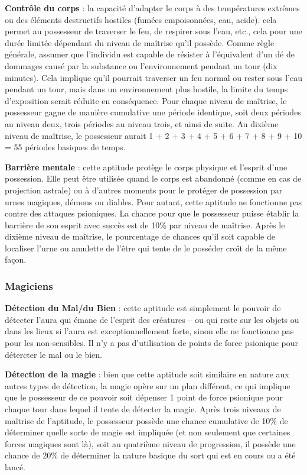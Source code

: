\documentclass[11pt]{article}
\begin{document}
{\bigskip

\textbf{Contrôle du corps} : la capacité d'adapter le corps à des températures extrêmes ou des éléments destructifs hostiles (fumées empoisonnées, eau, acide). cela permet au possesseur de traverser le feu, de respirer sous l'eau, etc., cela pour une durée limitée dépendant du niveau de maîtrise qu'il possède. Comme règle générale, assumer que l'individu est capable de résister à l'équivalent d'un dé de dommages causé par la substance ou l'environnement pendant un tour (dix minutes). Cela implique qu'il pourrait traverser un feu normal ou rester sous l'eau pendant un tour, mais dans un environnement plus hostile, la limite du temps d'exposition serait réduite en conséquence. Pour chaque niveau de maîtrise, le possesseur gagne de manière cumulative une période identique, soit deux périodes au niveau deux, trois périodes au niveau trois, et ainsi de suite. Au dixième niveau de maîtrise, le possesseur aurait 1 + 2 + 3 + 4 + 5 + 6 + 7 + 8 + 9 + 10 = 55 périodes basiques de temps.

\bigskip

\textbf{Barrière mentale} : cette aptitude protège le corps physique et l'esprit d'une possession. Elle peut être utilisée quand le corps est abandonné (comme en cas de projection astrale) ou à d'autres moments pour le protéger de possession par urnes magiques, démons ou diables. Pour autant, cette aptitude ne fonctionne pas contre des attaques psioniques. La chance pour que le possesseur puisse établir la barrière de son esprit avec succès est de 10\% par niveau de maîtrise. Après le dixième niveau de maîtrise, le pourcentage de chances qu'il soit capable de localiser l'urne ou amulette de l'être qui tente de le posséder croît de la même façon.

\subsubsection*{Magiciens}

\textbf{Détection du Mal/du Bien} : cette aptitude est simplement le pouvoir de détecter l'aura qui émane de l'esprit des créatures -- ou qui reste sur les objets ou dans les lieux si l'aura est exceptionnellement forte, sinon elle ne fonctionne pas pour les non-sensibles.%
Il n'y a pas d'utilisation de points de force psionique pour détercter le mal ou le bien.

\bigskip

\textbf{Détection de la magie} : bien que cette aptitude soit similaire en nature aux autres types de détection, la magie opère sur un plan différent, ce qui implique que le possesseur de ce pouvoir soit dépenser 1 point de force psionique pour chaque tour dans lequel il tente de détecter la magie. Après trois niveaux de maîtrise de l'aptitude, le possesseur possède une chance cumulative de 10\% de déterminer quelle sorte de magie est impliquée (et non seulement que certaines forces magiques sont là), soit au quatrième niveau de progression, il possède une chance de 20\% de déterminer la nature basique du sort qui est en cours ou a été lancé.

}
\end{document}
